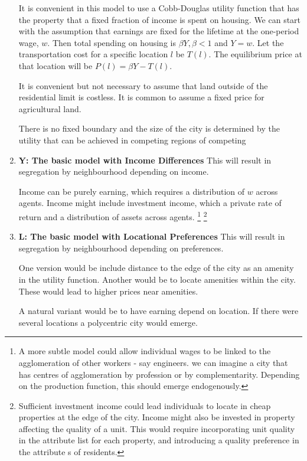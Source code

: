 \begin{enumerate}
It is convenient in this model to use a \gls{Cobb-Douglas} utility function that has the property that a fixed fraction of income is spent on housing.  We can start with the assumption that earnings are fixed for the lifetime at the one-period wage, $w$. Then total spending on housing is $\beta Y, \beta <1$ and $ Y=w$. Let the transportation cost for a specific location $l$ be $T(l)$. The  equilibrium price at that location will be $P(l)= \beta Y-T(l)$.

It is convenient but not necessary to assume that land outside of the residential limit is costless. It is common to assume a fixed price for agricultural land. 

There is no fixed boundary and the size of the city is determined by the utility that can be achieved in competing regions of competing

\item \textbf{Y: The basic model with Income Differences}
This will result in segregation by neighbourhood depending on income. 

Income can be purely earning, which requires a distribution of $w$ across agents. Income  might include investment income, which  a private rate of return and a distribution of assets across agents. \footnote{A more subtle model could allow individual wages to be linked to the agglomeration of other workers - say engineers. we can imagine a city that has centres of agglomeration by profession or by complementarity. Depending on the production function, this should emerge endogenously.}
\footnote{Sufficient investment income could lead individuals to locate in cheap properties at the edge of the city.  Income might also be invested in property affecting the quality of a unit. This would require incorporating unit quality in the attribute list for each property, and introducing a quality preference  in the attribute s of residents.}

\item \textbf{L: The basic model with Locational Preferences}
This will result in segregation by neighbourhood depending on preferences.

One version would be include distance to the edge of the city as an amenity in the utility function. Another would be to locate amenities within the city. These would lead to higher prices near amenities.

A natural variant would be to have earning depend on location. If there were several locations  a polycentric city would emerge.


\end{enumerate}

